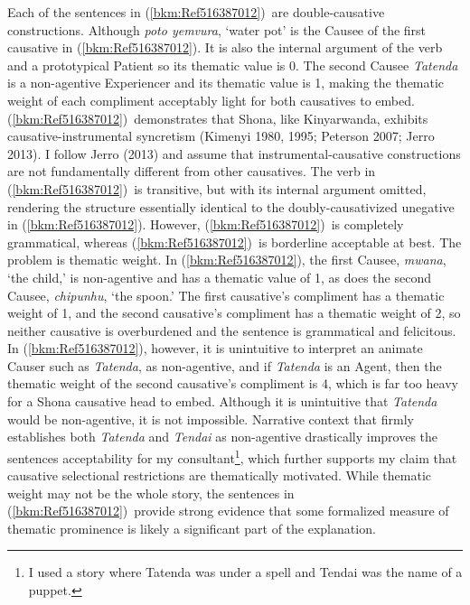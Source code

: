 \documentclass[12pt]{article}
\newenvironment{stylelsLanginfo}{\renewcommand\baselinestretch{1.0}\setlength\leftskip{0.0783in}\setlength\rightskip{0in plus 1fil}\setlength\parindent{0in}\setlength\parfillskip{0pt plus 1fil}\setlength\parskip{0in plus 1pt}\writerlistparindent\writerlistleftskip\leavevmode\normalfont\normalsize\writerlistlabel\ignorespaces}{\unskip\vspace{0in plus 1pt}\par}
\newcommand\writerlistleftskip{}
\newcommand\writerlistparindent{}
\newcommand\writerlistlabel{}
\begin{document}
\begin{stylelsLanginfo}
Each of the sentences in (\ref{bkm:Ref516387012})\ are double-causative constructions. Although \textit{poto yemvura}, ‘water pot’ is the Causee of the first causative in (\ref{bkm:Ref516387012}). It is also the internal argument of the verb and a prototypical Patient so its thematic value is 0. The second Causee \textit{Tatenda} is a non-agentive Experiencer and its thematic value is 1, making the thematic weight of each compliment acceptably light for both causatives to embed. (\ref{bkm:Ref516387012})\ demonstrates that Shona, like Kinyarwanda, exhibits causative-instrumental syncretism (Kimenyi 1980, 1995; Peterson 2007; Jerro 2013). I follow Jerro (2013) and assume that instrumental-causative constructions are not fundamentally different from other causatives. The verb in (\ref{bkm:Ref516387012})\ is transitive, but with its internal argument omitted, rendering the structure essentially identical to the doubly-causativized unegative in (\ref{bkm:Ref516387012}). However, (\ref{bkm:Ref516387012})\ is completely grammatical, whereas (\ref{bkm:Ref516387012})\ is borderline acceptable at best. The problem is thematic weight. In (\ref{bkm:Ref516387012}), the first Causee, \textit{mwana}, ‘the child,’ is non-agentive and has a thematic value of 1, as does the second Causee, \textit{chipunhu}, ‘the spoon.’ The first causative’s compliment has a thematic weight of 1, and the second causative’s compliment has a thematic weight of 2, so neither causative is overburdened and the sentence is grammatical and felicitous. In (\ref{bkm:Ref516387012}), however, it is unintuitive to interpret an animate Causer such as \textit{Tatenda}, as non-agentive, and if \textit{Tatenda} is an Agent, then the thematic weight of the second causative’s compliment is 4, which is far too heavy for a Shona causative head to embed. Although it is unintuitive that \textit{Tatenda} would be non-agentive, it is not impossible. Narrative context that firmly establishes both \textit{Tatenda} and \textit{Tendai} as non-agentive drastically improves the sentences acceptability for my consultant\footnote{ I used a story where Tatenda was under a spell and Tendai was the name of a puppet. }, which further supports my claim that causative selectional restrictions are thematically motivated. While thematic weight may not be the whole story, the sentences in (\ref{bkm:Ref516387012})\ provide strong evidence that some formalized measure of thematic prominence is likely a significant part of the explanation.
\end{stylelsLanginfo}
\end{document}
